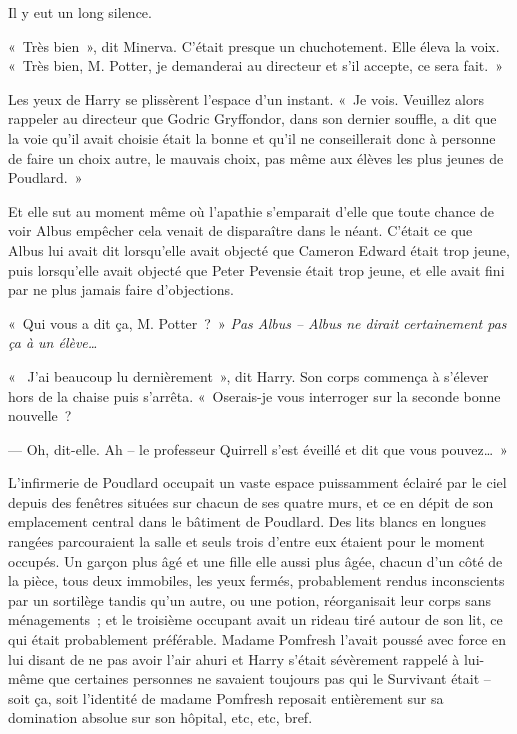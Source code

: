 Il y eut un long silence.

«~Très bien~», dit Minerva. C'était presque un chuchotement. Elle éleva la voix. «~Très bien, M. Potter, je demanderai au directeur et s'il accepte, ce sera fait.~»

Les yeux de Harry se plissèrent l'espace d'un instant. «~Je vois. Veuillez alors rappeler au directeur que Godric Gryffondor, dans son dernier souffle, a dit que la voie qu'il avait choisie était la bonne et qu'il ne conseillerait donc à personne de faire un choix autre, le mauvais choix, pas même aux élèves les plus jeunes de Poudlard.~»

Et elle sut au moment même où l'apathie s'emparait d'elle que toute chance de voir Albus empêcher cela venait de disparaître dans le néant. C'était ce que Albus lui avait dit lorsqu'elle avait objecté que Cameron Edward était trop jeune, puis lorsqu'elle avait objecté que Peter Pevensie était trop jeune, et elle avait fini par ne plus jamais faire d'objections.

«~Qui vous a dit ça, M. Potter~?~» \emph{Pas Albus -- Albus ne dirait certainement pas ça à un élève…}

«~ J'ai beaucoup lu dernièrement~», dit Harry. Son corps commença à s'élever hors de la chaise puis s'arrêta. «~Oserais-je vous interroger sur la seconde bonne nouvelle~?

--- Oh, dit-elle. Ah -- le professeur Quirrell s'est éveillé et dit que vous pouvez…~»

\later

L'infirmerie de Poudlard occupait un vaste espace puissamment éclairé par le ciel depuis des fenêtres situées sur chacun de ses quatre murs, et ce en dépit de son emplacement central dans le bâtiment de Poudlard. Des lits blancs en longues rangées parcouraient la salle et seuls trois d'entre eux étaient pour le moment occupés. Un garçon plus âgé et une fille elle aussi plus âgée, chacun d'un côté de la pièce, tous deux immobiles, les yeux fermés, probablement rendus inconscients par un sortilège tandis qu'un autre, ou une potion, réorganisait leur corps sans ménagements~; et le troisième occupant avait un rideau tiré autour de son lit, ce qui était probablement préférable. Madame Pomfresh l'avait poussé avec force en lui disant de ne pas avoir l'air ahuri et Harry s'était sévèrement rappelé à lui-même que certaines personnes ne savaient toujours pas qui le Survivant était -- soit ça, soit l'identité de madame Pomfresh reposait entièrement sur sa domination absolue sur son hôpital, etc, etc, bref.

